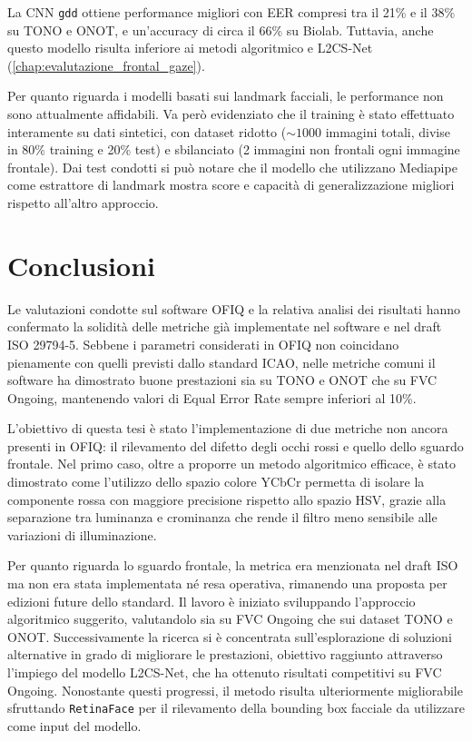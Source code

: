 \documentclass[12pt,a4paper,openright,twoside]{book}
\begin{document}
La CNN \texttt{gdd} ottiene performance migliori con EER compresi tra il 21\% e il 38\% su TONO e ONOT, e un'accuracy di circa il 66\% su Biolab. Tuttavia, anche questo modello risulta inferiore ai metodi algoritmico e L2CS-Net (\ref{chap:evalutazione_frontal_gaze}).  

Per quanto riguarda i modelli basati sui landmark facciali, le performance non sono attualmente affidabili. Va però evidenziato che il training è stato effettuato interamente su dati sintetici, con dataset ridotto (\(\sim1000\) immagini totali, divise in 80\% training e 20\% test) e sbilanciato (2 immagini non frontali ogni immagine frontale).
Dai test condotti si può notare che il modello che utilizzano Mediapipe come estrattore di landmark mostra score e capacità di generalizzazione migliori rispetto all'altro approccio.

\chapter{Conclusioni}
Le valutazioni condotte sul software OFIQ e la relativa analisi dei risultati hanno confermato la solidità delle metriche già implementate nel software e nel draft ISO 29794-5. Sebbene i parametri considerati in OFIQ non coincidano pienamente con quelli previsti dallo standard ICAO, nelle metriche comuni il software ha dimostrato buone prestazioni sia su TONO e ONOT che su FVC Ongoing, mantenendo valori di Equal Error Rate sempre inferiori al 10\%.  

L'obiettivo di questa tesi è stato l'implementazione di due metriche non ancora presenti in OFIQ: il rilevamento del difetto degli occhi rossi e quello dello sguardo frontale. Nel primo caso, oltre a proporre un metodo algoritmico efficace, è stato dimostrato come l'utilizzo dello spazio colore YCbCr permetta di isolare la componente rossa con maggiore precisione rispetto allo spazio HSV, grazie alla separazione tra luminanza e crominanza che rende il filtro meno sensibile alle variazioni di illuminazione.  

Per quanto riguarda lo sguardo frontale, la metrica era menzionata nel draft ISO ma non era stata implementata né resa operativa, rimanendo una proposta per edizioni future dello standard. Il lavoro è iniziato sviluppando l'approccio algoritmico suggerito, valutandolo sia su FVC Ongoing che sui dataset TONO e ONOT. Successivamente la ricerca si è concentrata sull'esplorazione di soluzioni alternative in grado di migliorare le prestazioni, obiettivo raggiunto attraverso l'impiego del modello L2CS-Net, che ha ottenuto risultati competitivi su FVC Ongoing. Nonostante questi progressi, il metodo risulta ulteriormente migliorabile sfruttando \texttt{RetinaFace} per il rilevamento della bounding box facciale da utilizzare come input del modello.  
\end{document}
